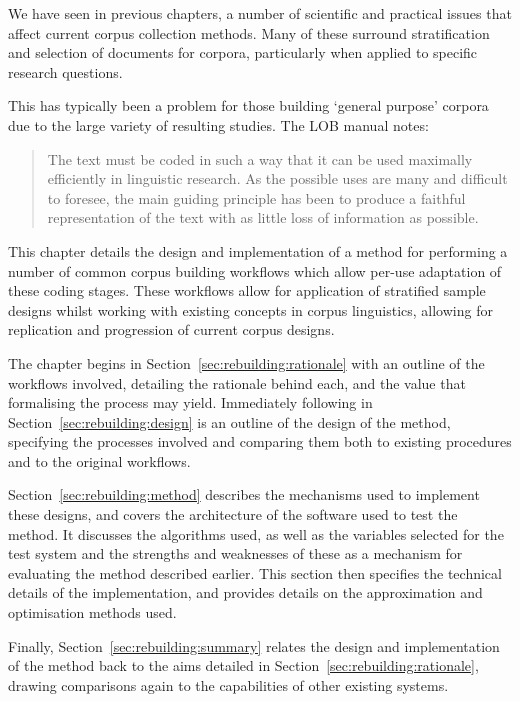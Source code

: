 

We have seen in previous chapters, a number of scientific and practical issues that affect current corpus collection methods.  Many of these surround stratification and selection of documents for corpora, particularly when applied to specific research questions.

This has typically been a problem for those building `general purpose' corpora due to the large variety of resulting studies.  The LOB manual\cite{johansson1986tagged} notes:

\begin{quote}
The text must be coded in such a way that it can be used maximally efficiently in linguistic research. As the possible uses are many and difficult to foresee, the main guiding principle has been to produce a faithful representation of the text with as little loss of information as possible.
\end{quote}


This chapter details the design and implementation of a method for performing a number of common corpus building workflows which allow per-use adaptation of these coding stages.  These workflows allow for application of stratified sample designs whilst working with existing concepts in corpus linguistics, allowing for replication and progression of current corpus designs.

The chapter begins in Section~\ref{sec:rebuilding:rationale} with an outline of the workflows involved, detailing the rationale behind each, and the value that formalising the process may yield.  Immediately following in Section~\ref{sec:rebuilding:design} is an outline of the design of the method, specifying the processes involved and comparing them both to existing procedures and to the original workflows.

Section~\ref{sec:rebuilding:method} describes the mechanisms used to implement these designs, and covers the architecture of the software used to test the method.  It discusses the algorithms used, as well as the variables selected for the test system and the strengths and weaknesses of these as a mechanism for evaluating the method described earlier.  This section then specifies the technical details of the implementation, and provides details on the approximation and optimisation methods used.  

Finally, Section~\ref{sec:rebuilding:summary} relates the design and implementation of the method back to the aims detailed in Section~\ref{sec:rebuilding:rationale}, drawing comparisons again to the capabilities of other existing systems.

